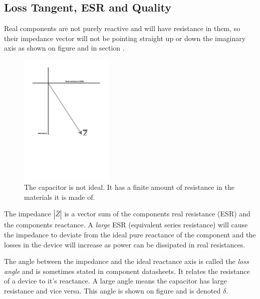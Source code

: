 \subsection{Loss Tangent, ESR and Quality} \label{subsec:LossTangent}

Real components are not purely reactive and will have resistance in them, so their impedance vector will not be pointing straight up or down the imaginary axis as shown on figure  and in section .

\begin{figure}[H]
    \centering
    \includegraphics[clip, trim=0 250 0 0, width=0.4\textwidth]{Sections/4_TechnicalAnalysis/Figures/4_1_4_LossTangent1.pdf}
    \caption{The capacitor is not ideal. It has a finite amount of resistance in the materials it is made of.}
    \label{fig:4_1_1_LossTangent1}
\end{figure}

The impedance $|\bar Z|$ is a vector sum of the components real resistance (ESR) and the components reactance. A \textit{large} ESR (equivalent series resistance) will cause the impedance to deviate from the ideal pure reactance of the component and the losses in the device will increase as power can be dissipated in real resistances.

The angle between the impedance and the ideal reactance axis is called the \textit{loss angle} and is sometimes stated in component datasheets. It relates the resistance of a device to it's reactance. A large angle means the capacitor has large resistance and vice versa. This angle is shown on figure  and is denoted $\delta$.

